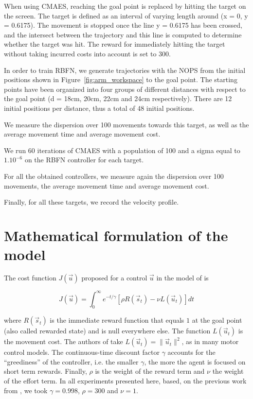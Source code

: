 \documentclass[pdftex,a4paper,11pt]{report}
\begin{document}
When using CMAES, reaching the goal point is replaced by hitting the target on the screen. The target is defined as an interval of varying length around (x = 0, y = 0.6175). The movement is stopped once the line y = 0.6175 has been crossed, and the intersect between the trajectory and this line is computed to determine whether the target was hit. The reward for immediately hitting the target without taking incurred costs into account is set to 300.

In order to train RBFN, we generate trajectories with the NOPS from the initial positions shown in Figure~\ref{fig:arm_workspace} to the goal point.
The starting points have been organized into four groups of different distances with respect to the goal point (d = 18cm, 20cm, 22cm and 24cm respectively). There are 12 initial positions per distance, thus a total of 48 initial positions.

We measure the dispersion over 100 movements towards this target, as well as the average movement time and average movement cost.

We run 60 iterations of CMAES with a population of 100 and a sigma equal to $1.10^{-6}$ on the RBFN controller for each target.

For all the obtained controllers, we measure again the dispersion over 100 movements, the average movement time and average movement cost.

Finally, for all these targets, we record the velocity profile.

\section{Mathematical formulation of the model}
\label{sec_modelformulation}

The cost function $J(\vec{u})$ proposed for a control $\vec{u}$ in the model of \cite{rigoux12} is

\begin{equation}
\label{eq:criterion}
 J(\vec{u}) = \int_0^{\infty} e^{-t/\gamma} [ \rho R(\vec{s}_t) - \nu L(\vec{u}_t) ] dt
\end{equation}

where $R(\vec{s}_t)$ is the immediate reward function that equals $1$ at the goal point (also called rewarded state) and is null everywhere else. The function $L(\vec{u}_t)$ is the movement cost. The authors of \cite{rigoux12} take $L(\vec{u}_t) = \|\vec{u}_t\|^2$, as in many motor control models. 
The continuous-time discount factor $\gamma$ accounts for the ``greediness'' of the controller, i.e. the smaller $\gamma$, the more the agent is focused on short term rewards.
Finally, $\rho$ is the weight of the reward term and $\nu$ the weight of the effort term.
In all experiments presented here, based, on the previous work from \cite{rigoux12}, we took $\gamma=0.998$, $\rho=300$ and $\nu=1$.
\end{document}

